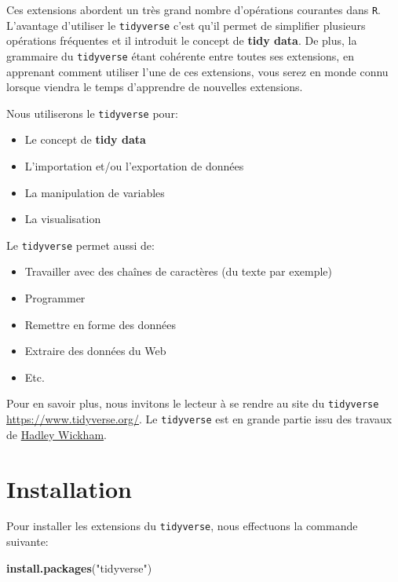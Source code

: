 \documentclass[]{book}
\newenvironment{Shaded}{\begin{snugshade}}{\end{snugshade}}
\newcommand{\KeywordTok}[1]{\textcolor[rgb]{0.13,0.29,0.53}{\textbf{#1}}}
\newcommand{\StringTok}[1]{\textcolor[rgb]{0.31,0.60,0.02}{#1}}
\newcommand{\NormalTok}[1]{#1}
\providecommand{\tightlist}{%
  \setlength{\itemsep}{0pt}\setlength{\parskip}{0pt}}
\begin{document}
Ces extensions abordent un très grand nombre d'opérations courantes dans
\texttt{R}. L'avantage d'utiliser le \texttt{tidyverse} c'est qu'il
permet de simplifier plusieurs opérations fréquentes et il introduit le
concept de \textbf{tidy data}. De plus, la grammaire du
\texttt{tidyverse} étant cohérente entre toutes ses extensions, en
apprenant comment utiliser l'une de ces extensions, vous serez en monde
connu lorsque viendra le temps d'apprendre de nouvelles extensions.

Nous utiliserons le \texttt{tidyverse} pour:

\begin{itemize}
\tightlist
\item
  Le concept de \textbf{tidy data}
\item
  L'importation et/ou l'exportation de données
\item
  La manipulation de variables
\item
  La visualisation
\end{itemize}

Le \texttt{tidyverse} permet aussi de:

\begin{itemize}
\tightlist
\item
  Travailler avec des chaînes de caractères (du texte par exemple)
\item
  Programmer
\item
  Remettre en forme des données
\item
  Extraire des données du Web
\item
  Etc.
\end{itemize}

Pour en savoir plus, nous invitons le lecteur à se rendre au site du
\texttt{tidyverse} \url{https://www.tidyverse.org/}. Le
\texttt{tidyverse} est en grande partie issu des travaux de
\href{http://hadley.nz/}{Hadley Wickham}.

\section{Installation}\label{installation}

Pour installer les extensions du \texttt{tidyverse}, nous effectuons la
commande suivante:

\begin{Shaded}
\begin{Highlighting}[]
\KeywordTok{install.packages}\NormalTok{(}\StringTok{"tidyverse"}\NormalTok{)}
\end{Highlighting}
\end{Shaded}
\end{document}
